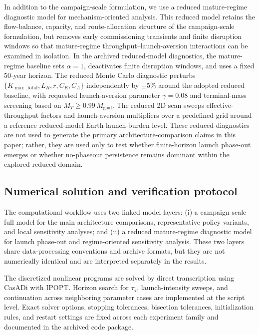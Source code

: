 \documentclass[12pt]{article}
\begin{document}
In addition to the campaign-scale formulation, we use a reduced mature-regime diagnostic model for mechanism-oriented analysis. This reduced model retains the flow-balance, capacity, and route-allocation structure of the campaign-scale formulation, but removes early commissioning transients and finite disruption windows so that mature-regime throughput--launch-aversion interactions can be examined in isolation. In the archived reduced-model diagnostics, the mature-regime baseline sets $\alpha=1$, deactivates finite disruption windows, and uses a fixed 50-year horizon. The reduced Monte Carlo diagnostic perturbs \(\{K_{\max,\mathrm{total}},L_R,r,C_E,C_A\}\) independently by \(\pm5\%\) around the adopted reduced baseline, with requested launch-aversion parameter \(\gamma=0.08\) and terminal-mass screening based on \(M_T\ge 0.99\,M_{\mathrm{goal}}\). The reduced 2D scan sweeps effective-throughput factors and launch-aversion multipliers over a predefined grid around a reference reduced-model Earth-launch-burden level. These reduced diagnostics are not used to generate the primary architecture-comparison claims in this paper; rather, they are used only to test whether finite-horizon launch phase-out emerges or whether no-phaseout persistence remains dominant within the explored reduced domain.

\subsection{Numerical solution and verification protocol}
\label{sec:methods_numerics}

The computational workflow uses two linked model layers: (i) a campaign-scale full model for the main architecture comparisons, representative policy variants, and local sensitivity analyses; and (ii) a reduced mature-regime diagnostic model for launch phase-out and regime-oriented sensitivity analysis. These two layers share data-processing conventions and archive formats, but they are not numerically identical and are interpreted separately in the results.

The discretized nonlinear programs are solved by direct transcription using CasADi with IPOPT. Horizon search for $\tau_\star$, launch-intensity sweeps, and continuation across neighboring parameter cases are implemented at the script level. Exact solver options, stopping tolerances, bisection tolerances, initialization rules, and restart settings are fixed across each experiment family and documented in the archived code package.
\end{document}
